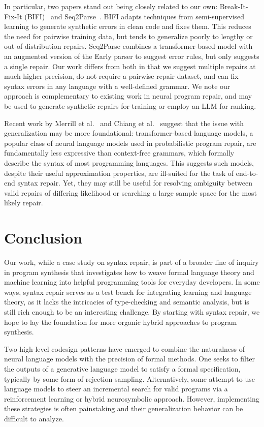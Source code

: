 \documentclass[sigplan,review,acmsmall,nonacm,screen,anonymous]{acmart}\settopmatter{printfolios=false,printccs=false,printacmref=false}
\begin{document}
In particular, two papers stand out being closely related to our own: Break-It-Fix-It (BIFI)~\cite{yasunaga2021break} and Seq2Parse~\cite{sakkas2022seq2parse}. BIFI adapts techniques from semi-supervised learning to generate synthetic errors in clean code and fixes them. This reduces the need for pairwise training data, but tends to generalize poorly to lengthy or out-of-distribution repairs. Seq2Parse combines a transformer-based model with an augmented version of the Early parser to suggest error rules, but only suggests a single repair. Our work differs from both in that we suggest multiple repairs at much higher precision, do not require a pairwise repair dataset, and can fix syntax errors in any language with a well-defined grammar. We note our approach is complementary to existing work in neural program repair, and may be used to generate synthetic repairs for training or employ an LLM for ranking.

Recent work by Merrill et al.~\cite{merrill2022saturated} and Chiang et al.~\cite{chiang2023tighter} suggest that the issue with generalization may be more foundational: transformer-based language models, a popular class of neural language models used in probabilistic program repair, are fundamentally less expressive than context-free grammars, which formally describe the syntax of most programming languages. This suggests such models, despite their useful approximation properties, are ill-suited for the task of end-to-end syntax repair. Yet, they may still be useful for resolving ambiguity between valid repairs of differing likelihood or searching a large sample space for the most likely repair.

\clearpage\section{Conclusion}\label{sec:conclusion}

Our work, while a case study on syntax repair, is part of a broader line of inquiry in program synthesis that investigates how to weave formal language theory and machine learning into helpful programming tools for everyday developers. In some ways, syntax repair serves as a test bench for integrating learning and language theory, as it lacks the intricacies of type-checking and semantic analysis, but is still rich enough to be an interesting challenge. By starting with syntax repair, we hope to lay the foundation for more organic hybrid approaches to program synthesis.

Two high-level codesign patterns have emerged to combine the naturalness of neural language models with the precision of formal methods. One seeks to filter the outputs of a generative language model to satisfy a formal specification, typically by some form of rejection sampling. Alternatively, some attempt to use language models to steer an incremental search for valid programs via a reinforcement learning or hybrid neurosymbolic approach. However, implementing these strategies is often painstaking and their generalization behavior can be difficult to analyze.
\end{document}
